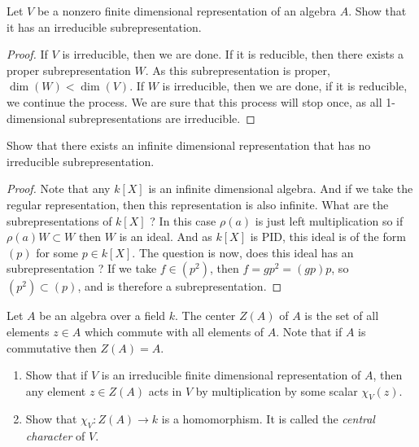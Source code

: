 \begin{thm}
Let \(V\) be a nonzero finite dimensional representation of an algebra \(A\). Show that it has an irreducible subrepresentation.
\end{thm}

\begin{proof}
If $V$ is irreducible, then we are done. If it is reducible, then there exists a proper subrepresentation $W$. As this subrepresentation is proper, $\dim(W) < \dim (V)$. If $W$ is irreducible, then we are done, if it is reducible, we continue the process. We are sure that this process will stop once, as all 1-dimensional subrepresentations are irreducible.
\end{proof}

\begin{thm}
Show that there exists an infinite dimensional representation that has no irreducible subrepresentation.
\end{thm}

\begin{proof}
Note that any $k[X]$ is an infinite dimensional algebra. And if we take the regular representation, then this representation is also infinite. What are the subrepresentations of $k[X]$ ? In this case $\rho(a)$ is just left multiplication so if $\rho(a)W \subset W$ then $W$ is an ideal. And as $k[X]$ is PID, this ideal is of the form $(p)$ for some $p \in k[X]$. The question is now, does this ideal has an subrepresentation ? If we take $f \in (p^2)$, then $f= gp^2= (gp)p$, so $(p^2)\subset (p)$, and is therefore a subrepresentation. 
\end{proof}

\begin{defn}
Let \(A\) be an algebra over a field \(k\). The center \(Z(A)\) of \(A\) is the set of all elements \(z\in A\) which commute with all elements of \(A\). Note that if \(A\) is commutative then \(Z(A)=A\).
\end{defn}


\begin{thm} 
\begin{enumerate}
  \item Show that if \(V\) is an irreducible finite dimensional representation of \(A\), then any element \(z\in Z(A)\) acts in \(V\) by multiplication by some scalar \(\chi _{V} (z)\).
  \item Show that \(\chi _{V} :Z(A)\rightarrow k\) is a homomorphism. It is called the \emph{central character} of \(V\).
\end{enumerate}

\end{thm}

